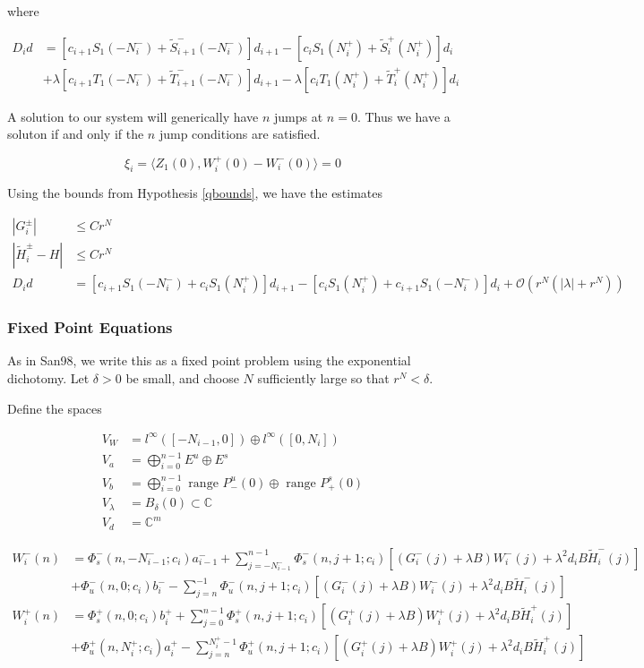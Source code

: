 \documentclass[12pt]{article}
\def\C{{\mathbb C}}
\begin{document}
where

\begin{align*}
D_i d &= [ c_{i+1} S_1(-N_i^-) + \tilde{S}_{i+1}^-(-N_i^-)] d_{i+1}
- [ c_i S_1(N_i^+) + \tilde{S}_i^+(N_i^+)] d_i \\
&+ \lambda[ c_{i+1} T_1(-N_i^-) + \tilde{T}_{i+1}^-(-N_i^-)] d_{i+1}
- \lambda[ c_i T_1(N_i^+) + \tilde{T}_i^+(N_i^+)] d_i 
\end{align*}

A solution to our system will generically have $n$ jumps at $n = 0$. Thus we have a soluton if and only if the $n$ jump conditions are satisfied.

\begin{equation}\label{jumpcond}
\xi_i = \langle Z_1(0), W_i^+(0) - W_i^-(0) \rangle = 0
\end{equation}

Using the bounds from Hypothesis \ref{qbounds}, we have the estimates

\begin{align*}
|G_i^\pm| &\leq C r^N \\
|\tilde{H}_i^\pm - H| &\leq C r^N \\
D_i d &= [ c_{i+1} S_1(-N_i^-) + c_i S_1(N_i^+) ] d_{i+1}
- [ c_i S_1(N_i^+) + c_{i+1} S_1(-N_i^-) ] d_i 
+\mathcal{O}(r^N( |\lambda| + r^N))
\end{align*}

\subsubsection{Fixed Point Equations}

As in San98, we write this as a fixed point problem using the exponential dichotomy. Let $\delta > 0$ be small, and choose $N$ sufficiently large so that $r^N < \delta$.  

Define the spaces

\begin{align*}
V_W &= l^\infty([-N_{i-1}, 0]) \oplus l^\infty([0, N_i])  \\
V_a &= \bigoplus_{i=0}^{n-1} E^u \oplus E^s \\
V_b &= \bigoplus_{i=0}^{n-1} 
\text{ range } P_-^u(0) \oplus \text{ range } P_+^s(0)\\
V_\lambda &= B_\delta(0) \subset \C \\
V_d &= \C^m
\end{align*}

\begin{align*}
W_i^-(n) &= 
\Phi_s^-(n, -N_{i-1}^-; c_i) a_{i-1}^- + \sum_{j = -N_{i-1}^-}^{n-1} \Phi_s^-(n, j+1; c_i)
[(G_i^-(j) + \lambda B) W_i^-(j) + \lambda^2 d_i B \tilde{H}_i^-(j)]
 \\
&+ \Phi_u^-(n, 0; c_i) b_i^- - \sum_{j = n}^{-1} \Phi_u^-(n, j+1; c_i) 
[(G_i^-(j) + \lambda B) W_i^-(j) + \lambda^2 d_i B \tilde{H}_i^-(j)] \\
W_i^+(n) &= \Phi_s^+(n, 0; c_i) b_i^+ + \sum_{j = 0}^{n-1} \Phi_s^+(n, j+1; c_i) 
[(G_i^+(j) + \lambda B) W_i^+(j) + \lambda^2 d_i B \tilde{H}_i^+(j)] \\
&+ \Phi_u^+(n, N_i^+; c_i) a_i^+ - \sum_{j = n}^{N_i^+-1} \Phi_u^+(n, j+1; c_i) 
[(G_i^+(j) + \lambda B) W_i^+(j) + \lambda^2 d_i B \tilde{H}_i^+(j)]
\end{align*}
\end{document}
